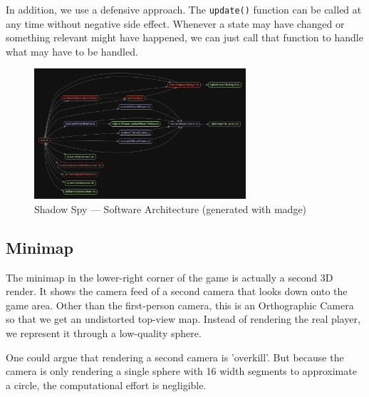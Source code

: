 \documentclass[11pt]{article}
\begin{document}
\par In addition, we use a defensive approach. The \texttt{update()} function can be called at any time without negative side effect. Whenever a state may have changed or something relevant might have happened, we can just call that function to handle what may have to be handled.
\begin{figure}[H]
 \centering
    \includegraphics[width=0.7\textwidth]{architecture}
    \caption{Shadow Spy — Software Architecture (generated with madge)}
\end{figure}

\subsection{Minimap}
\par The minimap in the lower-right corner of the game is actually a second 3D render. It shows the camera feed of a second camera that looks down onto the game area. Other than the first-person camera, this is an Orthographic Camera so that we get an undistorted top-view map. Instead of rendering the real player, we represent it through a low-quality sphere.
\par One could argue that rendering a second camera is 'overkill'. But because the camera is only rendering a single sphere with 16 width segments to approximate a circle, the computational effort is negligible.
\end{document}
